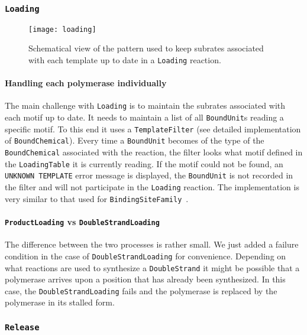 \subsubsection{\texttt{Loading}}

\begin{figure}[!h]
  \centering
  \texttt{[image: loading]}
  \caption{Schematical view of the pattern used to keep subrates
  associated with each template up to date in a \texttt{Loading} reaction.}
\label{fig:det_loading}
\end{figure}

\paragraph{Handling each polymerase individually}
The main challenge with \texttt{Loading} is to maintain
the subrates associated with each motif up to date.
It needs to maintain a list of all \texttt{BoundUnit}s reading a specific motif.
To this end it uses a \texttt{TemplateFilter} (see detailed implementation of \texttt{BoundChemical}).
Every time a \texttt{BoundUnit} becomes of the type of the \texttt{BoundChemical} associated with the reaction,
the filter looks what motif defined in the \texttt{LoadingTable} it is currently reading.
If the motif could not be found, an \texttt{UNKNOWN TEMPLATE} error message is displayed,
the \texttt{BoundUnit} is not recorded in the filter and will not participate in the \texttt{Loading} reaction.
The implementation is very similar to that used for \texttt{BindingSiteFamily}~.

\paragraph{\texttt{ProductLoading} vs \texttt{DoubleStrandLoading}}
The difference between the two processes is rather small.
We just added a failure condition in the case of \texttt{DoubleStrandLoading} for convenience.
Depending on what reactions are used to synthesize a \texttt{DoubleStrand}
it might be possible that a polymerase arrives upon a position that has already been synthesized.
In this case, the \texttt{DoubleStrandLoading} fails and the polymerase is replaced by the polymerase in its stalled form.


\subsubsection{\texttt{Release}}

